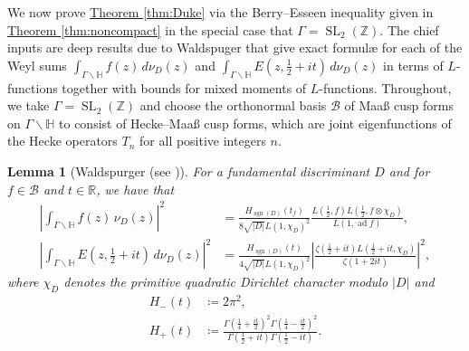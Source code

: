 \documentclass[11pt,a4paper]{amsart}
\newcommand{\BB}{\mathcal{B}}
\newcommand{\Hb}{\mathbb{H}}
\newcommand{\R}{\mathbb{R}}
\newcommand{\Z}{\mathbb{Z}}
\DeclareMathOperator{\ad}{ad}
\DeclareMathOperator{\sgn}{sgn}
\DeclareMathOperator{\SL}{SL}
\numberwithin{equation}{section}
\newtheorem{lemma}[equation]{Lemma}
\theoremstyle{remark}
\theoremstyle{definition}
\begin{document}
We now prove \hyperref[thm:Duke]{Theorem \ref*{thm:Duke}} via the Berry--Esseen inequality given in \hyperref[thm:noncompact]{Theorem \ref*{thm:noncompact}} in the special case that $\Gamma = \SL_2(\Z)$. The chief inputs are deep results due to Waldspuger that give exact formul\ae{} for each of the Weyl sums $\int_{\Gamma \backslash \Hb} f(z) \, d\nu_D(z)$ and $\int_{\Gamma \backslash \Hb} E(z,\frac{1}{2} + it) \, d\nu_D(z)$ in terms of $L$-functions together with bounds for mixed moments of $L$-functions. Throughout, we take $\Gamma = \SL_2(\Z)$ and choose the orthonormal basis $\BB$ of Maa\ss{} cusp forms on $\Gamma \backslash \Hb$ to consist of Hecke--Maa\ss{} cusp forms, which are joint eigenfunctions of the Hecke operators $T_n$ for all positive integers $n$.

\begin{lemma}[{Waldspurger \cite{Wal85} (see \cite[Theorems 3 and 5 and (5.17)]{DIT16})}]
\label{lem:DukeWaldspurger}
For a fundamental discriminant $D$ and for $f \in \BB$ and $t \in \R$, we have that
\begin{align*}
\left|\int_{\Gamma \backslash \Hb} f(z) \, \nu_D(z)\right|^2 & = \frac{H_{\sgn(D)}(t_f)}{8\sqrt{|D|} L(1,\chi_D)^2} \frac{L\left(\frac{1}{2},f\right) L\left(\frac{1}{2}, f \otimes \chi_D\right)}{L(1,\ad f)},	\\
\left|\int_{\Gamma \backslash \Hb} E\left(z,\frac{1}{2} + it\right) \, d\nu_D(z)\right|^2 & = \frac{H_{\sgn(D)}(t)}{4\sqrt{|D|} L(1,\chi_D)^2} \left|\frac{\zeta\left(\frac{1}{2} + it\right) L\left(\frac{1}{2} + it, \chi_D\right)}{\zeta(1 + 2it)}\right|^2,
\end{align*}
where $\chi_D$ denotes the primitive quadratic Dirichlet character modulo $|D|$ and
\begin{align*}
H_{-}(t) & \coloneqq 2\pi^2,	\\
H_{+}(t) & \coloneqq \frac{\Gamma\left(\frac{1}{4} + \frac{it}{2}\right)^2 \Gamma\left(\frac{1}{4} - \frac{it}{2}\right)^2}{\Gamma\left(\frac{1}{2} + it\right) \Gamma\left(\frac{1}{2} - it\right)}.
\end{align*}
\end{lemma}
\end{document}
